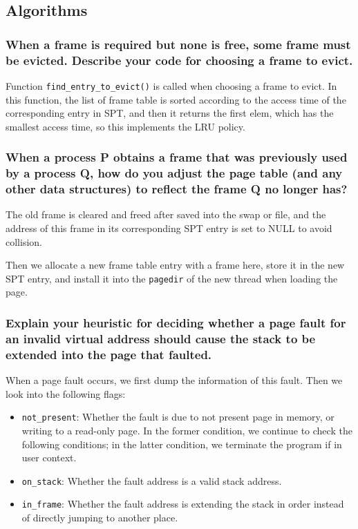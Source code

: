 \documentclass[sigconf, nonacm, balance=false, urlbreakonhyphens=true]{acmart}
\begin{document}
        \subsection{Algorithms}

            \subsubsection{When a frame is required but none is free, some frame must be evicted.  Describe your code for choosing a frame to evict. } 

                Function \texttt{find\_entry\_to\_evict()} is called when choosing a frame to evict. In this function, the list of frame table is sorted according to the access time of the corresponding entry in SPT, and then it returns the first elem, which has the smallest access time, so this implements the LRU policy. 

            \subsubsection{When a process P obtains a frame that was previously used by a process Q, how do you adjust the page table (and any other data structures) to reflect the frame Q no longer has? }

                The old frame is cleared and freed after saved into the swap or file, and the address of this frame in its corresponding SPT entry is set to NULL to avoid collision. 
                
                Then we allocate a new frame table entry with a frame here, store it in the new SPT entry, and install it into the \texttt{pagedir} of the new thread when loading the page.  

            \subsubsection{Explain your heuristic for deciding whether a page fault for an invalid virtual address should cause the stack to be extended into the page that faulted. }

                When a page fault occurs, we first dump the information of this fault. Then we look into the following flags:
                
                \begin{itemize}
                    \item \texttt{not\_present}: Whether the fault is due to not present page in memory, or writing to a read-only page. In the former condition, we continue to check the following conditions; in the latter condition, we terminate the program if in user context. 
                    \item \texttt{on\_stack}: Whether the fault address is a valid stack address. 
                    \item \texttt{in\_frame}: Whether the fault address is extending the stack in order instead of directly jumping to another place. 
                \end{itemize}
\end{document}
